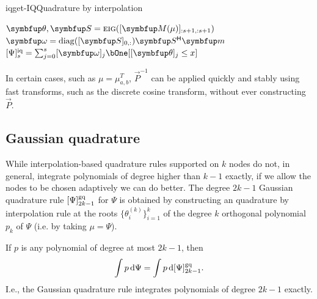 \begin{labelalgorithm}[H]{iq}{get-IQ}{Quadrature by interpolation}
\begin{algorithmic}[1]
    \State \( \vec{\theta},\vec{S} = \Call{eig}{[\vec{M}(\mu)]_{:s+1,:s+1}} \) 
    \State \( \vec{\omega} = \operatorname{diag}([\vec{S}]_{0,:})\vec{S}^\cT \vec{m} \) 
    \State \Return \( \qq[i]{\Psi}{s} = \sum_{j=0}^{s} [\vec{\omega}]_{j} \bOne[ [\vec{\theta}]_{j} \leq x] \)
\EndProcedure
\end{algorithmic}
\end{labelalgorithm}

\begin{remark}   
In certain cases, such as \( \mu = \mu_{a,b}^T \), \( \vec{P}^{-1} \) can be applied quickly and stably using fast transforms, such as the discrete cosine transform, without ever constructing \( \vec{P} \).
\end{remark}



\subsection{Gaussian quadrature}
\label{sec:gq}

While interpolation-based quadrature rules supported on \( k \) nodes do not, in general, integrate polynomials of degree higher than \( k-1 \) exactly, if we allow the nodes to be chosen adaptively we can do better.
The degree \( 2k-1 \) Gaussian quadrature rule \( \qq[g]{\Psi}{2k-1} \) for \( \Psi \) is obtained by constructing an quadrature by interpolation rule at the roots \( \{ \theta_{i}^{(k)} \}_{i=1}^{k} \) of the degree \( k \) orthogonal polynomial \( p_{k} \) of \( \Psi \) (i.e. by taking \( \mu = \Psi \)).
\begin{theorem}
If \( p \) is any polynomial of degree at most \( 2k-1 \), then 
\begin{equation*}
    \int p\,\d\Psi = \int p \,\d\qq[g]{\Psi}{2k-1}.
\end{equation*}
I.e., the Gaussian quadrature rule integrates polynomials of degree \( 2k-1 \) exactly.
\end{theorem}

